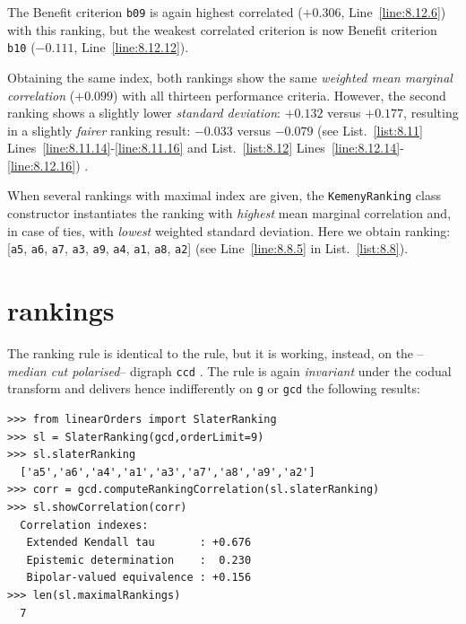 The Benefit criterion \texttt{b09} is again highest correlated ($+0.306$, Line~\ref{line:8.12.6}) with this \Kemeny ranking, but the weakest correlated criterion is now Benefit criterion \texttt{b10} ($-0.111$, Line~\ref{line:8.12.12}).

Obtaining the same \Kemeny index, both \Kemeny rankings show the same \emph{weighted mean marginal correlation} ($+0.099$) with all thirteen performance criteria. However, the second ranking shows a slightly lower \emph{standard deviation}: $+0.132$ versus $+0.177$, resulting in a slightly \emph{fairer} ranking result: $-0.033$ versus $-0.079$ (see List.~\vref{list:8.11} Lines~\ref{line:8.11.14}-\ref{line:8.11.16} and List.~\ref{list:8.12} Lines~\ref{line:8.12.14}-\ref{line:8.12.16}) .

When several rankings with maximal \Kemeny index are given, the \texttt{Kemeny\-Ranking} class constructor instantiates the ranking with \emph{highest} mean marginal correlation and, in case of ties, with \emph{lowest} weighted standard deviation. Here we obtain ranking: [\texttt{a5}, \texttt{a6}, \texttt{a7}, \texttt{a3}, \texttt{a9}, \texttt{a4}, \texttt{a1}, \texttt{a8}, \texttt{a2}] (see Line~\ref{line:8.8.5} in List.~\vref{list:8.8}).

\section{\Slater rankings}
\label{sec:8.5}

The \Slater ranking rule is identical to the \Kemeny rule, but it is working, instead, on the \Condorcet --\emph{median cut polarised}-- digraph \texttt{ccd} \citep{SLA-1961}. The \Slater rule is again \emph{invariant} under the codual transform and delivers hence indifferently on \texttt{g} or \texttt{gcd} the following results:
\begin{lstlisting}[caption={Computing a \Slater ranking},label=list:8.13]   
>>> from linearOrders import SlaterRanking
>>> sl = SlaterRanking(gcd,orderLimit=9)
>>> sl.slaterRanking
  ['a5','a6','a4','a1','a3','a7','a8','a9','a2']
>>> corr = gcd.computeRankingCorrelation(sl.slaterRanking)
>>> sl.showCorrelation(corr)
  Correlation indexes:
   Extended Kendall tau       : +0.676
   Epistemic determination    :  0.230
   Bipolar-valued equivalence : +0.156
>>> len(sl.maximalRankings)
  7
\end{lstlisting}

